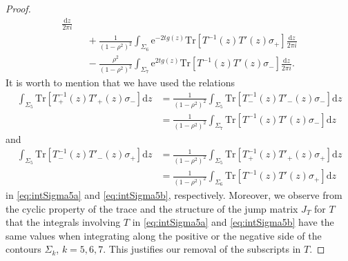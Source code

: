 \documentclass[11pt,a4paper]{article}
\numberwithin{equation}{section}
\begin{document}
\begin{proof}
\begin{align}
\frac{\mathrm{d}z}{2\pi i} \\ \label{eq:intSigma5b}
&~~~+\frac{1}{(1-\rho^2)^2}\int_{\Sigma_6}\mathrm{e}^{-2tg(z)}
\mathrm{Tr}\left[T^{-1}(z)T'(z)\sigma_+\right]\frac{\mathrm{d}z}{2\pi i}\nonumber\\
&~~~-\frac{\rho^2}{(1-\rho^2)^2}\int_{\Sigma_7}\mathrm{e}^{2tg(z)}
\mathrm{Tr}\left[T^{-1}(z)T'(z)\sigma_-\right]\frac{\mathrm{d}z}{2\pi i}.
\end{align}
It is worth to mention that we have used the relations
\begin{align*}\int_{\Sigma_5}\mathrm{Tr}\left[T^{-1}_{+}(z)T'_{+}(z)\sigma_{-}\right]\mathrm{d}z
&=\frac{1}{(1-\rho^2)^2}\int_{\Sigma_{5}}\mathrm{Tr}\left[T^{-1}_{-}(z)T'_{-}(z)\sigma_{-}\right]\mathrm{d}z\\
&=\frac{1}{(1-\rho^2)^2}\int_{\Sigma_{7}}\mathrm{Tr}\left[T^{-1}(z)T'(z)\sigma_{-}\right]\mathrm{d}z
\end{align*}
and
\begin{align*}\int_{\Sigma_5}\mathrm{Tr}\left[T^{-1}_{-}(z)T'_{-}(z)\sigma_{+}\right]\mathrm{d}z
&=\frac{1}{(1-\rho^2)^2}\int_{\Sigma_{5}}\mathrm{Tr}\left[T^{-1}_{+}(z)T'_{+}(z)\sigma_{+}\right]\mathrm{d}z\\
&=\frac{1}{(1-\rho^2)^2}\int_{\Sigma_{6}}\mathrm{Tr}\left[T^{-1}(z)T'(z)\sigma_{+}\right]\mathrm{d}z
\end{align*}in \eqref{eq:intSigma5a} and \eqref{eq:intSigma5b}, respectively. Moreover,
we observe from the cyclic property of the trace and the structure of the jump matrix $J_T$ for $T$ that the integrals involving $T$ in  \eqref{eq:intSigma5a} and \eqref{eq:intSigma5b} have the same values when integrating along the positive or the negative side of the contours $\Sigma_k$, $k=5,6,7$. This justifies our
removal of the subscripts in $T$.




\end{proof}
\end{document}
